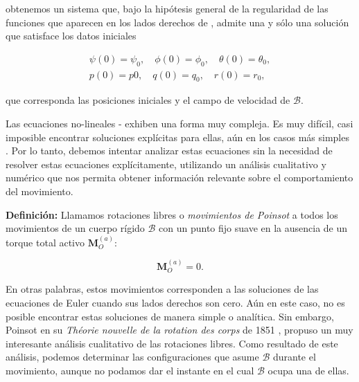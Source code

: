 \documentclass[a4paper,10pt]{article}
\numberwithin{equation}{section}
\newcommand{\definicion}{\textbf{Definición: }}
\begin{document}
obtenemos un sistema que, bajo la hipótesis general de la regularidad de las funciones 
que aparecen en los lados derechos de , admite 
una y sólo una solución que satisface los datos iniciales

\begin{align}
 \psi(0) = \psi_0, \quad \phi(0) = \phi_0, \quad \theta(0) = \theta_0, \\
 p(0) = p0, \quad q(0) = q_0, \quad r(0) = r_0, 
 \label{eq:poinsot13}
\end{align}

que corresponda las posiciones iniciales y el campo de velocidad de $\mathcal{B}$.

\vspace{.3cm}

Las ecuaciones no-lineales - exhiben una forma muy compleja.
Es muy difícil, casi imposible encontrar soluciones explícitas para ellas, aún en los casos
más simples \cite{romano}. Por lo tanto, debemos intentar analizar estas ecuaciones sin 
la necesidad de resolver estas ecuaciones explícitamente, utilizando un análisis cualitativo
y numérico que nos permita obtener información relevante sobre el comportamiento del movimiento.

\vspace{.3cm}

\definicion Llamamos rotaciones libres o \emph{movimientos de Poinsot} a todos los movimientos 
de un cuerpo rígido $\mathcal{B}$ con un punto fijo suave en la ausencia de un torque 
total activo $\mathbf{M}_O^{(a)}$:

\begin{equation}
 \mathbf{M}_O^{(a)} = 0.
 \label{eq:poinsot14}
\end{equation}

En otras palabras, estos movimientos corresponden a las soluciones de las ecuaciones de 
Euler cuando sus lados derechos son cero. Aún en este caso, no es posible encontrar 
estas soluciones de manera simple o analítica. Sin embargo, Poinsot en su \emph{Théorie nouvelle de la
rotation des corps} de 1851 \cite{poinsot} , propuso  un muy interesante análisis cualitativo de las rotaciones libres. 
Como resultado de este  análisis, podemos determinar las configuraciones que asume $\mathcal{B}$ 
durante el movimiento, aunque no podamos dar el instante en el cual $\mathcal{B}$ ocupa una de ellas.

\vspace{.3cm}
\end{document}
